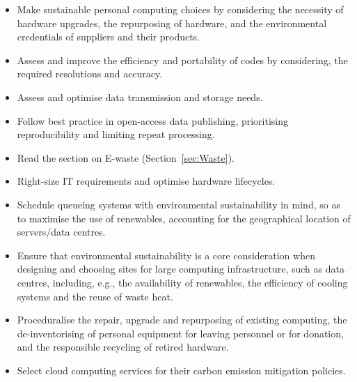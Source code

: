 \documentclass[../SustainableHEP.tex]{subfiles}
\begin{document}
\newpage
\begin{reco2}{\currentname}
{
\begin{itemize}[leftmargin=6 mm]
\item Make sustainable personal computing choices by considering the necessity of hardware upgrades, the repurposing of hardware, and the environmental credentials of suppliers and their products. 

\item Assess and improve the efficiency and portability of codes by considering, \eg the required resolutions and accuracy.

\item Assess and optimise data transmission and storage needs.

\item Follow best practice in open-access data publishing, prioritising reproducibility and limiting repeat processing.

\item Read the section on E-waste (Section~\ref{sec:Waste}).

\end{itemize}
}
{
\begin{itemize}[leftmargin=6 mm]
\item Right-size IT requirements and optimise hardware lifecycles.
\item Schedule queueing systems with environmental sustainability in mind, so as to maximise the use of renewables, accounting for the geographical location of servers/data centres.
\end{itemize}
}
{
\begin{itemize}[leftmargin=6 mm]
\item Ensure that environmental sustainability is a core consideration when designing and choosing sites for large computing infrastructure, such as data centres, including, e.g., the availability of renewables, the efficiency of cooling systems and the reuse of waste heat.

\item Proceduralise the repair, upgrade and repurposing of existing computing, the de-inventorising of personal equipment for leaving personnel or for donation, and the responsible recycling of retired hardware.

\item Select cloud computing services for their carbon emission mitigation policies.

\end{itemize}
}
\end{reco2}
\end{document}
